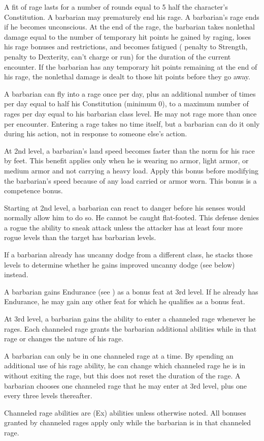 \par A fit of rage lasts for a number of rounds equal to 5 \add half the character's Constitution.   A barbarian may prematurely end his
rage.  A barbarian's rage ends if he becomes unconscious. At the end of the rage, the barbarian takes nonlethal damage equal to the number of temporary hit points he gained by raging, loses his rage bonuses and restrictions, and becomes fatigued ( penalty to Strength,  penalty to Dexterity, can't charge or run) for the duration of the current encounter.  If the barbarian has any temporary hit points remaining at the end of his rage, the nonlethal damage is dealt to those hit points before they go away.

\par A barbarian can fly into a rage once per day, plus an additional number of times per day equal to half his Constitution (minimum 0), to a maximum number of rages per day equal to his barbarian class level. He may not rage more than once per encounter. Entering a rage takes no time itself, but a barbarian can do it only during his action, not in response to someone else's action.

 At 2nd level, a barbarian's land speed becomes faster than the norm for his race by  feet. This benefit applies only when he is wearing no armor, light armor, or medium  armor and not carrying a heavy load. Apply this bonus before modifying the barbarian's speed because of any load carried or armor worn. This bonus is a competence bonus.

 Starting at 2nd level, a barbarian can react to danger before his senses would normally allow him to do so. He cannot be caught flat-footed. This defense denies a rogue the ability to sneak attack unless the attacker has at least four more rogue levels than the target has barbarian levels.

If a barbarian already has uncanny dodge from a different class, he stacks those levels to determine whether he gains improved uncanny dodge (see below) instead.

 A barbarian gains Endurance (see ) as a bonus feat at 3rd level. If he already has Endurance, he may gain any other feat for which he qualifies as a bonus feat.

 At 3rd level, a barbarian gains the ability to enter a channeled rage whenever he rages. Each channeled rage grants the barbarian additional abilities while in that rage or changes the nature of his rage.
\par A barbarian can only be in one channeled rage at a time. By spending an additional use of his rage ability, he can change which channeled rage he is in without exiting the rage, but this does not reset the duration of the rage. A barbarian chooses one channeled rage that he may enter at 3rd level, plus one every three levels thereafter.
\par Channeled rage abilities are (Ex) abilities unless otherwise noted. All bonuses granted by channeled rages apply only while the barbarian is in that channeled rage.

